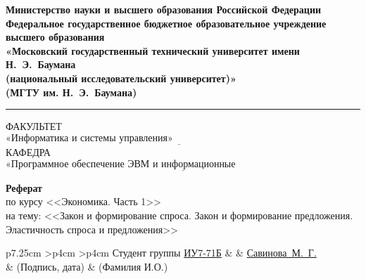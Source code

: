\documentclass{bmstu}
\newenvironment{signstabular}[1][1]{
	\renewcommand*{\arraystretch}{#1}
	\tabular
}{
	\endtabular
}
\begin{document}
	\begin{titlepage}
		\fontsize{12pt}{12pt}\selectfont
		\noindent \begin{minipage}{0.15\textwidth}
		\end{minipage}
		\noindent\begin{minipage}{0.9\textwidth}\centering
			\textbf{Министерство науки и высшего образования Российской Федерации}\\
			\textbf{Федеральное государственное бюджетное образовательное учреждение высшего образования}\\
			\textbf{«Московский государственный технический университет имени Н.~Э.~Баумана}\\
			\textbf{(национальный исследовательский университет)»}\\
			\textbf{(МГТУ им. Н.~Э.~Баумана)}
		\end{minipage}
		
		\noindent\rule{18cm}{3pt}
		\newline\newline
		\noindent ФАКУЛЬТЕТ $\underline{\text{«Информатика и системы управления»~~~~~~~~~~~~~~~~~~~~~~~~~~~~~~~~~~~~~~~~~~~~~~~~~~~~~~~}}$ \newline\newline
		\noindent КАФЕДРА $\underline{\text{«Программное обеспечение ЭВМ и информационные технологии»~~~~~~~~~~~~~~~~~~~~~~~}}$\newline\newline\newline\newline\newline\newline\newline
		
		\begin{center}
			\textbf{\large Реферат} \\
			\large по курсу <<Экономика. Часть 1>> \\
			на тему: <<Закон и формирование спроса. Закон и формирование предложения. Эластичность спроса и предложения>>
		\end{center}
		
		\vfill
		\vfill
		\vfill
		\vfill
		
		\begin{table}[h!]
			\fontsize{12pt}{0.7\baselineskip}\selectfont
			\centering
			\begin{signstabular}[0.7]{p{7.25cm} >{\centering\arraybackslash}p{4cm} >{\centering\arraybackslash}p{4cm}}
				Студент группы \uline{ИУ7-71Б} & \uline{\mbox{\hspace*{4cm}}} & \uline{\hfill Савинова~М.~Г. \hfill} \\
				& \scriptsize (Подпись, дата) & \scriptsize (Фамилия И.О.)
			\end{signstabular}
			

\end{table}
\end{titlepage}
\end{document}
